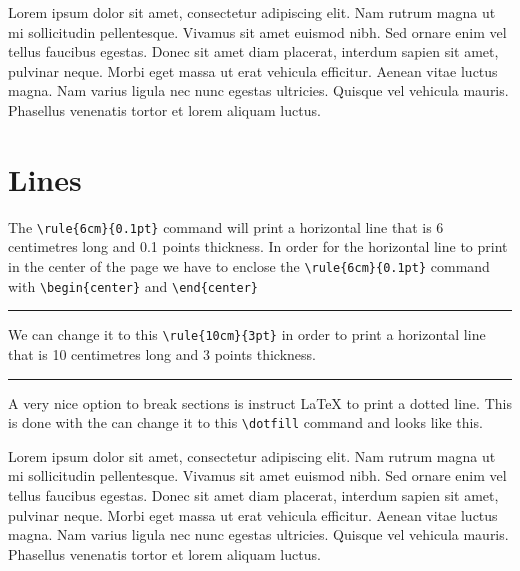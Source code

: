 Lorem ipsum dolor sit amet, consectetur adipiscing elit. Nam rutrum magna ut mi sollicitudin pellentesque. Vivamus sit amet euismod nibh. Sed ornare enim vel tellus faucibus egestas. Donec sit amet diam placerat, interdum sapien sit amet, pulvinar neque. Morbi eget massa ut erat vehicula efficitur. Aenean vitae luctus magna. Nam varius ligula nec nunc egestas ultricies. Quisque vel vehicula mauris. Phasellus venenatis tortor et lorem aliquam luctus.


\section{Lines}


The \verb|\rule{6cm}{0.1pt}| command will print a horizontal line that is 6 centimetres long and 0.1 points thickness. In order for the horizontal line to print in the center of the page we have to enclose the \verb|\rule{6cm}{0.1pt}| command with \verb|\begin{center}| and \verb|\end{center}|

\begin{center}
    \rule{6cm}{0.1pt}
\end{center}

We can change it to this \verb|\rule{10cm}{3pt}| in order to print a horizontal line that is 10 centimetres long and 3 points thickness. 

\begin{center}
    \rule{10cm}{2pt}
\end{center}


A very nice option to break sections is instruct LaTeX to print a dotted line. This is done with the  can change it to this \verb|\dotfill| command and looks like this. 

 \dotfill

Lorem ipsum dolor sit amet, consectetur adipiscing elit. Nam rutrum magna ut mi sollicitudin pellentesque. Vivamus sit amet euismod nibh. Sed ornare enim vel tellus faucibus egestas. Donec sit amet diam placerat, interdum sapien sit amet, pulvinar neque. Morbi eget massa ut erat vehicula efficitur. Aenean vitae luctus magna. Nam varius ligula nec nunc egestas ultricies. Quisque vel vehicula mauris. Phasellus venenatis tortor et lorem aliquam luctus.
